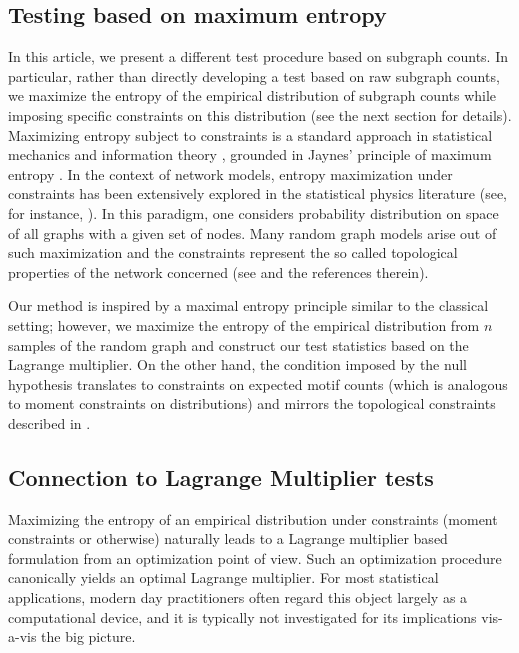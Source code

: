 \documentclass[12pt]{article}
\numberwithin{equation}{section}
\begin{document}
\subsection{Testing based on maximum entropy} In this article, we present a different test procedure based on subgraph counts. In particular, rather than directly developing a test based on raw subgraph counts, we maximize the entropy of the empirical distribution of subgraph counts while imposing specific constraints on this distribution (see the next section for details). Maximizing entropy subject to constraints is a standard approach in statistical mechanics and information theory \cite{Jaynes_maxent,Shannon1948}, grounded in Jaynes’ principle of maximum entropy \cite{jaynes1982rationale}. In the context of network models, entropy maximization under constraints has been extensively explored in the statistical physics literature (see, for instance, \cite{park2004statistical}). In this paradigm, one considers probability distribution on space of all graphs with a given set of nodes. Many random graph models arise out of such maximization and the constraints represent the so called topological properties of the network concerned (see \cite{squartini2017maximum} and the references therein).  

 
Our method is inspired by a maximal entropy principle similar to the classical setting; however, we maximize the entropy of the empirical distribution from $n$ samples of the random graph and construct our test statistics based on the Lagrange multiplier. On the other hand, the condition imposed by the null hypothesis translates to constraints on expected motif counts (which is analogous to moment constraints on distributions) and mirrors the topological constraints described in \cite{squartini2017maximum}. \\
 
\subsection{Connection to Lagrange Multiplier tests} Maximizing the entropy of an empirical distribution  under constraints (moment constraints or otherwise) naturally leads to a Lagrange multiplier based formulation from an optimization point of view. Such an optimization procedure canonically yields an optimal Lagrange multiplier. For most statistical applications, modern day practitioners often regard this object largely as a computational device, and it is typically not investigated for its implications vis-a-vis the big picture.
\end{document}
